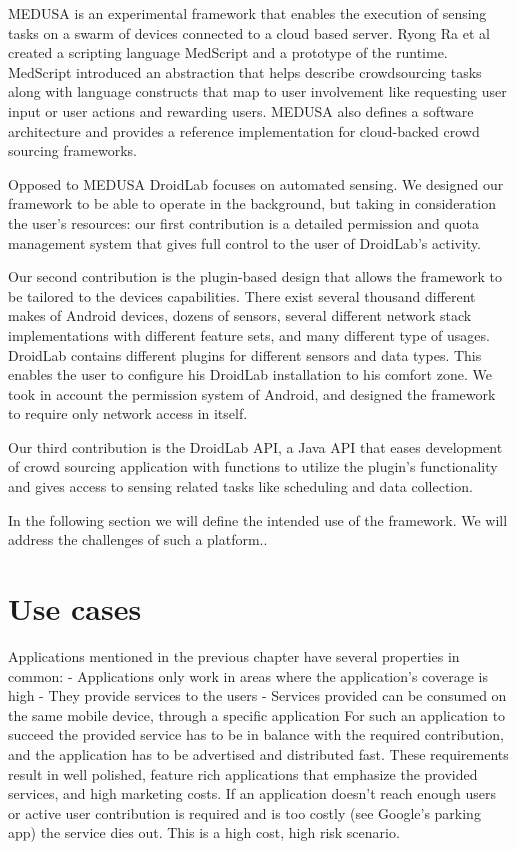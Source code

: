 \documentclass[conference,letterpaper]{IEEEtran}
\begin{document}
MEDUSA is an experimental framework that enables the execution of sensing tasks on a swarm of devices connected to a cloud based server. Ryong Ra et al created a scripting language MedScript and a prototype of the runtime. MedScript introduced an abstraction that helps describe crowdsourcing tasks along with language constructs that map to user involvement like requesting user input or user actions and rewarding users. MEDUSA also defines a software architecture and provides a reference implementation for cloud-backed crowd sourcing frameworks.

Opposed to MEDUSA DroidLab focuses on automated sensing. We designed our framework to be able to operate in the background, but taking in consideration the user's resources: our first contribution is a detailed permission and quota management system that gives full control to the user of DroidLab's activity.

Our second contribution is the plugin-based design that allows the framework to be tailored to the devices capabilities. There exist several thousand different makes of Android devices, dozens of sensors, several different network stack implementations with different feature sets, and many different type of usages. DroidLab contains different plugins for different sensors and data types. This enables the user to configure his DroidLab installation to his comfort zone. We took in account the permission system of Android, and designed the framework to require only network access in itself.

Our third contribution is the DroidLab API, a Java API that eases development of crowd sourcing application with functions to utilize the plugin's functionality and gives access to sensing related tasks like scheduling and data collection.

In the following section we will define the intended use of the framework. We will address the challenges of such a platform..

\section{Use cases}
\label{sec:use_cases}
Applications mentioned in the previous chapter have several properties in common:
- Applications only work in areas where the application's coverage is high
- They provide services to the users
- Services provided can be consumed on the same mobile device, through a specific application
For such an application to succeed the provided service has to be in balance with the required contribution, and the application has to be advertised and distributed fast. These requirements result in well polished, feature rich applications that emphasize the provided services, and high marketing costs. If an application doesn't reach enough users or active user contribution is required and is too costly (see Google's parking app) the service dies out. This is a high cost, high risk scenario.
\end{document}
